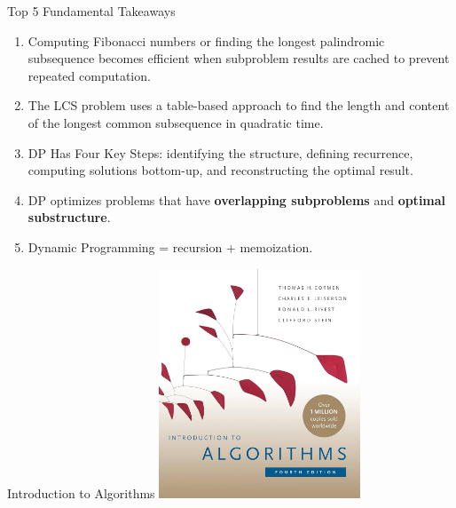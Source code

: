 \documentclass{beamer}
\begin{document}
\begin{frame}{Top 5 Fundamental Takeaways}
    \small
    \begin{enumerate} \pause

        \item[5] Computing Fibonacci numbers or finding the longest palindromic subsequence becomes efficient when subproblem results are cached to prevent repeated computation. \pause

        \item[4] The LCS problem uses a table-based approach to find the length and content of the longest common subsequence in quadratic time. \pause

        \item[3] DP Has Four Key Steps: identifying the structure, defining recurrence, computing solutions bottom-up, and reconstructing the optimal result. \pause

        \item[2] DP optimizes problems that have \textbf{overlapping subproblems} and \textbf{optimal substructure}. \pause

        \item[1] Dynamic Programming = recursion + memoization.
    \end{enumerate}
\end{frame}

\begin{frame}{Introduction to Algorithms}
    \centering
    \includegraphics[width=0.45\textwidth]{figures/book_cover.jpg} \\
\end{frame}
\end{document}
